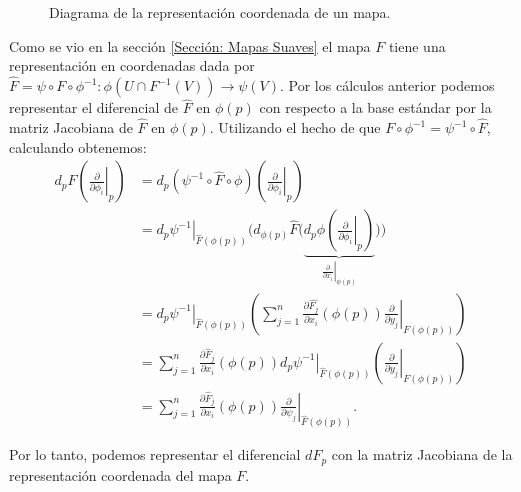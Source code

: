 \begin{figure}[h]
	{
		
	}
	\caption*{Diagrama de la representación coordenada de un mapa.}
\end{figure}
Como se vio en la sección \ref{Sección: Mapas Suaves} el mapa $F$ tiene una representación en coordenadas dada por $\hat{F} = \psi \circ F \circ \phi^{-1}: \phi(U \cap F^{-1}(V)) \to \psi(V)$. Por los cálculos anterior podemos representar el diferencial de $\hat{F}$ en $\phi(p)$ con respecto a la base estándar por la matriz Jacobiana de $\hat{F}$ en $\phi(p)$. Utilizando el hecho de que $F \circ \phi^{-1} = \psi^{-1} \circ \hat{F}$, calculando obtenemos:
\begin{align*}
	d_{p}F \left( \left. \frac{\partial}{\partial \phi_i} \right|_{p}\right) & =
	d_p(\psi^{-1}\circ\hat{F}\circ \phi)\left(\left.\frac{\partial}{\partial \phi_i}\right |_p\right) \\
	                                                                         & =
	\left. d_p \psi^{-1} \right|_{\hat{F}(\phi(p))}
	\Biggl(
	d_{\phi(p)} \hat{F}
	\Biggl(
	\underbrace{d_p \phi
		\left(
		\left. \frac{\partial}{\partial \phi_i} \right|_{p}
		\right)}_{\left. \frac{\partial}{\partial x_i} \right|_{\phi (p)}}
	\Biggr)	\Biggr)                                                                                   \\
	                                                                         & =
	\left. d_p \psi^{-1} \right|_{\hat{F}(\phi(p))}
	\left(
	\sum_{j=1}^{n} \frac{\partial \hat{F_j}}{\partial x_i} \left( \phi(p) \right)
	\left. \frac{\partial}{\partial y_j} \right|_{F(\phi(p))}
	\right)                                                                                           \\
	                                                                         & =
	\sum_{j=1}^{n} \frac{\partial \hat{F}_j}{\partial x_i} (\phi(p))
	\left. d_p \psi^{-1} \right|_{\hat{F}(\phi(p))}
	\left(
	\left. \frac{\partial}{\partial y_j}\right|_{F(\phi(p))}
	\right)                                                                                           \\
	                                                                         & =
	\sum_{j=1}^{n} \frac{\partial \hat{F}_j}{\partial x_i} (\phi(p))
	\left.
	\frac{\partial}{\partial \psi_{j}}
	\right|_{\hat{F}(\phi(p))}.
\end{align*}

Por lo tanto, podemos representar el diferencial $dF_p$ con la matriz Jacobiana de la representación coordenada del mapa $F$.


